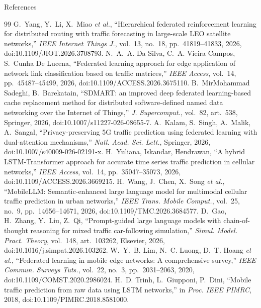 \documentclass[11pt,aspectratio=169]{beamer}
\begin{document}
\begin{frame}[allowframebreaks]{References}
  \tiny
  \begin{thebibliography}{99}
    \setlength{\itemsep}{0pt}
     G.~Yang, Y.~Li, X.~Miao \emph{et al.}, ``Hierarchical federated reinforcement learning for distributed routing with traffic forecasting in large-scale LEO satellite networks,'' \emph{IEEE Internet Things J.}, vol.~13, no.~18, pp.~41819--41833, 2026, doi:10.1109/JIOT.2026.3708793.
     N.~A.~A. Da Silva, C.~A. Vieira Campos, S.~Cunha De Lucena, ``Federated learning approach for edge application of network link classification based on traffic matrices,'' \emph{IEEE Access}, vol.~14, pp.~45487--45499, 2026, doi:10.1109/ACCESS.2026.3675110.
     B.~MirMohammad Sadeghi, B.~Barekatain, ``SDMART: an improved deep federated learning-based cache replacement method for distributed software-defined named data networking over the Internet of Things,'' \emph{J. Supercomput.}, vol.~82, art.~538, Springer, 2026, doi:10.1007/s11227-026-08655-7.
     A.~Kalam, S.~Singh, A.~Malik, A.~Sangal, ``Privacy-preserving 5G traffic prediction using federated learning with dual-attention mechanisms,'' \emph{Natl. Acad. Sci. Lett.}, Springer, 2026, doi:10.1007/s40009-026-02191-x.
     H.~Yuliana, Iskandar, Hendrawan, ``A hybrid LSTM-Transformer approach for accurate time series traffic prediction in cellular networks,'' \emph{IEEE Access}, vol.~14, pp.~35047--35073, 2026, doi:10.1109/ACCESS.2026.3669215.
     H.~Wang, J.~Chen, X.~Song \emph{et al.}, ``MobileLLM: Semantic-enhanced large language model for multimodal cellular traffic prediction in urban networks,'' \emph{IEEE Trans. Mobile Comput.}, vol.~25, no.~9, pp.~14656--14671, 2026, doi:10.1109/TMC.2026.3684577.
     D.~Gao, H.~Zhang, Y.~Liu, Z.~Qi, ``Prompt-guided large language models with chain-of-thought reasoning for mixed traffic car-following simulation,'' \emph{Simul. Model. Pract. Theory}, vol.~148, art.~103262, Elsevier, 2026, doi:10.1016/j.simpat.2026.103262.
     W.~Y.~B. Lim, N.~C. Luong, D.~T. Hoang \emph{et al.}, ``Federated learning in mobile edge networks: A comprehensive survey,'' \emph{IEEE Commun. Surveys Tuts.}, vol.~22, no.~3, pp.~2031--2063, 2020, doi:10.1109/COMST.2020.2986024.
     H.~D. Trinh, L.~Giupponi, P.~Dini, ``Mobile traffic prediction from raw data using LSTM networks,'' in \emph{Proc. IEEE PIMRC}, 2018, doi:10.1109/PIMRC.2018.8581000.

\end{thebibliography}
\end{frame}
\end{document}
